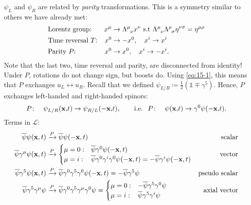 $\psi_L$ and $\psi_R$ are related by \emph{parity} transformations. This is a symmetry similar to others we have already met:
\begin{align}
  &\text{Lorentz group:} &x^{\mu} &\to \Lambda \indices{^{\mu}_{\nu}} x^{\nu} \text{ s.t } \Lambda \indices{^{\mu}_{\nu}} \Lambda \indices{^{\rho}_{\sigma}} \eta^{\nu\sigma} = \eta^{\mu\rho} \\
  &\text{Time reversal $T$:} &x^0 &\to - x^0, \quad x^i \to x^i \\
  &\text{Parity $P$:} &x^0 &\to x^0, \quad x^i \to -x^i.
\end{align}
Note that the last two, time reversal and parity, are disconnected from identity!
Under $P$, rotations do not change sign, but boosts do. Using \eqref{eq:15-1}, this means that $P$ exchanges $u_L \leftrightarrow u_R$.
Recall that we defined $\psi_{L/R} \coloneqq \frac{1}{2} (\mathbb{1} \mp \gamma^5)$. Hence, $P$ exchanges left-handed and right-handed spinors:
\begin{equation}
  P\colon \quad \psi_{L/R} (\vb{x,} t) \to \psi_{R/L} (-\vb{x,} t), \qquad \text{i.e. }\; P \colon \quad \psi(\vb{x,} t) \to \gamma^0 \psi(-\vb{x,} t).
\end{equation}
Terms in $\mathcal{L}$:
\begin{align}
  \overline{\psi}\psi(\vb{x}, t) &\xrightarrow{P} \overline{\psi}\psi(-\vb{x}, t) \qquad &\text{scalar} \\
  \overline{\psi}\gamma^{\mu} \psi(\vb{x} , t) &\xrightarrow{P} 
  \begin{cases}
    \mu = 0: & \overline{\psi} \gamma^0 \psi(-\vb{x}, t) \\
    \mu = i: & \overline{\psi} \gamma^0 \gamma^i \gamma^0 \psi(-\vb{x}, t) = -\overline{\psi}\gamma^i \psi(-\vb{x}, t)
  \end{cases}
  &\text{vector} \\
  \overline{\psi} \gamma^5 \psi(\vb{x}, t) &\xrightarrow{P} \overline{\psi} \gamma^0 \gamma^5 \gamma^0 \psi(-\vb{x}, t) = -\overline{\psi} \gamma^5 \psi & \text{pseudo scalar} \\
  \overline{\psi}\gamma^5 \gamma^{\mu} \psi &\xrightarrow{P} \overline{\psi}\gamma^0 \gamma^5 \gamma^{\mu} \gamma^0 \psi = 
  \begin{cases}
    \mu =0: & -\overline{\psi} \gamma^5 \gamma^0 \psi \\
    \mu = i: & \overline{\psi}\gamma^5 \gamma^i \psi
  \end{cases}
					    & \text{axial vector}
\end{align}

